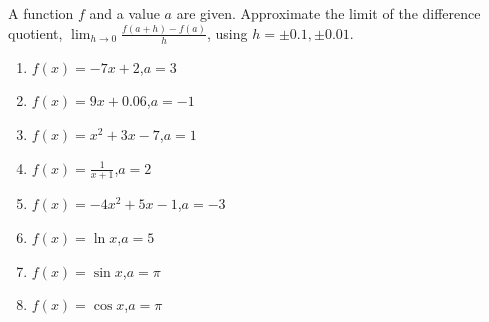 \begin{multicols}{2}
\begin{enumialphparenastyle}
\begin{ex}
\begin{sol}
\begin{enumerate}
\end{enumerate}
\end{sol}

\end{ex}

\begin{ex}
A function $f$ and a value $a$ are given. Approximate the limit of the difference quotient, $\displaystyle \lim_{h\to 0}\frac{f(a+h)-f(a)}{h}$, using $h = \pm 0.1, \pm 0.01$.
\begin{enumerate}
\item {$f(x) = -7x+2$,\quad  $a=3$}
\item {$f(x) = 9x+0.06$,\quad  $a=-1$}
\item {$f(x) = x^2+3x-7$,\quad  $a=1$}
\item {$\displaystyle f(x) = \frac{1}{x+1}$,\quad  $a=2$}
\item {$\displaystyle f(x) = -4x^2+5x-1$,\quad  $a=-3$}
\item {$\displaystyle f(x) =\ln x$,\quad  $a=5$}
\item {$\displaystyle f(x) =\sin x$,\quad $a=\pi$} 
\item {$\displaystyle f(x) =\cos x$,\quad  $a=\pi$}

\end{enumerate}


\end{ex}
\end{enumialphparenastyle}
\end{multicols}
